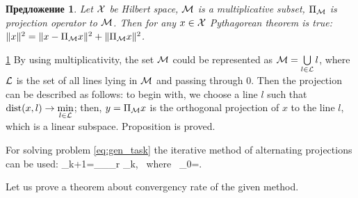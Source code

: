 \documentclass[12pt,a4paper,fleqn,leqno]{article}
\newtheorem{proposition}{Предложение}
\begin{document}
\begin{proposition} \label{pythaprop}
Let $\mathcal{X}$ be Hilbert space, $\mathcal{M}$ is a multiplicative subset, $\Pi_{\mathcal{M}}$ is projection operator to $\mathcal{M}$. Then for any $x \in \mathcal{X}$ Pythagorean theorem is true: $\|x\|^2 = \|x - \Pi_{\mathcal{M}} x\|^2 + \|\Pi_{\mathcal{M}} x\|^2$.
\end{proposition}
\begin{proof5}{\ref{pythaprop}}
By using multiplicativity, the set $\mathcal{M}$ could be represented as $\mathcal{M} = \bigcup\limits_{l \in \mathcal{L}}l$, where $\mathcal{L}$ is the set of all lines lying in $\mathcal{M}$ and passing through $0$. Then the projection can be described as follows: to begin with, we choose a line $l$ such that $\mathop{\mathrm{dist}}(x, l) \rightarrow \min\limits_{l \in \mathcal{L}}$; then, $y = \Pi_{\mathcal{M}} x$ is the orthogonal projection of $x$ to the line $l$, which is a linear subspace. Proposition is proved.
\end{proof5}

For solving problem \eqref{eq:gen_task} the iterative method of alternating projections can be used:
\be
   \bfY_{k+1}=\Pi_\calH \Pi_{\calM_r} \bfY_{k}, \mbox{\ where\ } \bfY_{0}=\bfX.
\ee

Let us prove a theorem about convergency rate of the given method.
\end{document}
